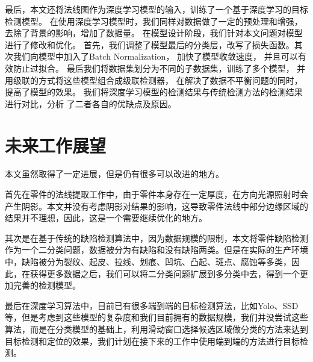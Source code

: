 最后，本文还将法线图作为深度学习模型的输入，训练了一个基于深度学习的目标检测模型。
在使用深度学习模型时，我们同样对数据做了一定的预处理和增强，去除了背景的影响，增加了数据量。
在模型设计阶段，我们针对本文问题对模型进行了修改和优化。
首先，我们调整了模型最后的分类层，改写了损失函数。其次我们向模型中加入了Batch Normalization，
加快了模型收敛速度，
并且可以有效防止过拟合。
最后我们将数据集划分为不同的子数据集，训练了多个模型，
并用级联的方式将这些模型组合成级联检测器，
在解决了数据不平衡问题的同时，提高了模型的效果。
我们将深度学习模型的检测结果与传统检测方法的检测结果进行对比，分析
了二者各自的优缺点及原因。


\section{未来工作展望}

本文虽然取得了一定进展，但是仍有很多可以改进的地方。

首先在零件的法线提取工作中，由于零件本身存在一定厚度，在方向光源照射时会产生阴影。本文并没有考虑阴影对结果的影响，这导致零件法线中部分边缘区域的结果并不理想，因此，这是一个需要继续优化的地方。

其次是在基于传统的缺陷检测算法中，因为数据规模的限制，本文将零件缺陷检测作为一个二分类问题，数据被分为有缺陷和没有缺陷两类。但是在实际的生产环境中，缺陷被分为裂纹、起皮、拉线、划痕、凹坑、凸起、斑点、腐蚀等多类，因此，在获得更多数据之后，我们可以将二分类问题扩展到多分类中去，得到一个更加完善的检测模型。

最后在深度学习算法中，目前已有很多端到端的目标检测算法，比如Yolo、SSD等，但是考虑到这些模型的复杂度和我们目前拥有的数据规模，我们并没尝试这些算法，而是在分类模型的基础上，利用滑动窗口选择候选区域做分类的方法来达到目标检测和定位的效果，我们计划在接下来的工作中使用端到端的方法进行目标检测。